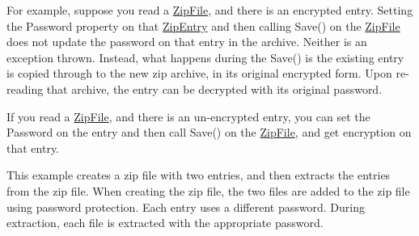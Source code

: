 For example, suppose you read a {\ttfamily \mbox{\hyperlink{class_super_tiled2_unity_1_1_ionic_1_1_zip_1_1_zip_file}{Zip\+File}}}, and there is an encrypted entry. Setting the Password property on that {\ttfamily \mbox{\hyperlink{class_super_tiled2_unity_1_1_ionic_1_1_zip_1_1_zip_entry}{Zip\+Entry}}} and then calling {\ttfamily Save()} on the {\ttfamily \mbox{\hyperlink{class_super_tiled2_unity_1_1_ionic_1_1_zip_1_1_zip_file}{Zip\+File}}} does not update the password on that entry in the archive. Neither is an exception thrown. Instead, what happens during the {\ttfamily Save()} is the existing entry is copied through to the new zip archive, in its original encrypted form. Upon re-\/reading that archive, the entry can be decrypted with its original password. 

If you read a \mbox{\hyperlink{class_super_tiled2_unity_1_1_ionic_1_1_zip_1_1_zip_file}{Zip\+File}}, and there is an un-\/encrypted entry, you can set the {\ttfamily Password} on the entry and then call Save() on the \mbox{\hyperlink{class_super_tiled2_unity_1_1_ionic_1_1_zip_1_1_zip_file}{Zip\+File}}, and get encryption on that entry. 

This example creates a zip file with two entries, and then extracts the entries from the zip file. When creating the zip file, the two files are added to the zip file using password protection. Each entry uses a different password. During extraction, each file is extracted with the appropriate password. 


